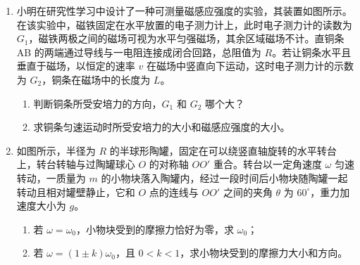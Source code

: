 \documentclass[\gkver]{gaokaozhenti}
\begin{document}
\begin{enumerate}
{\begin{enumerate}
\end{enumerate}
}

\item
小明在研究性学习中设计了一种可测量磁感应强度的实验，其装置如图所示。在该实验中，磁铁固定在水平放置的电子测力计上，此时电子测力计的读数为 $G_1$，磁铁两极之间的磁场可视为水平匀强磁场，其余区域磁场不计。直铜条 AB 的两端通过导线与一电阻连接成闭合回路，总阻值为 $R$。若让铜条水平且垂直于磁场，以恒定的速率 $v$ 在磁场中竖直向下运动，这时电子测力计的示数为 $G_2$，铜条在磁场中的长度为 $L$。
\begin{enumerate}
	\item
	判断铜条所受安培力的方向，$G_1$ 和 $G_2$ 哪个大？
	\item
	求铜条匀速运动时所受安培力的大小和磁感应强度的大小。
\end{enumerate}



\item
如图所示，半径为 $R$ 的半球形陶罐，固定在可以绕竖直轴旋转的水平转台上，转台转轴与过陶罐球心 $O$ 的对称轴 $OO'$ 重合。转台以一定角速度 $\omega$ 匀速转动，一质量为 $m$ 的小物块落入陶罐内，经过一段时间后小物块随陶罐一起转动且相对罐壁静止，它和 $O$ 点的连线与 $OO'$ 之间的夹角 $\theta$ 为 $60^{\circ}$，重力加速度大小为 $g$。
\begin{enumerate}
	\item
	若 $\omega=\omega_0$，小物块受到的摩擦力恰好为零，求 $\omega_0$；
	\item
	若 $\omega=(1\pm k)\omega_0$，且 $0<k<1$，求小物块受到的摩擦力大小和方向。
\end{enumerate}


\end{enumerate}
\end{document}
